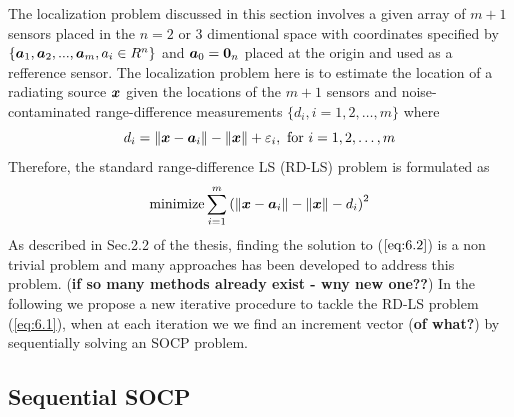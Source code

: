 The localization problem discussed in this section involves a given array of $m+1$ sensors placed in the $n = 2$ or 3 dimentional space with coordinates specified by $\{\mbox{\boldmath$a$}_1, \mbox{\boldmath$a$}_2, . . . , \mbox{\boldmath$a$}_m , a_i \in R^n\}$ and  $\mbox{\boldmath$a$}_0 = \mbox{\boldmath${0}$}_n$ placed at the origin and used as a refference sensor. The localization problem here is to estimate the location of a radiating source $\mbox{\boldmath$x$}$ given the locations of the $m+1$ sensors and noise-contaminated range-difference measurements $\{d_i, i = 1, 2, \ldots, m\}$ where 
\begin{equation} \label{eq:6.1}
d_i = \|\mbox{\boldmath$x$} - \mbox{\boldmath$a$}_i\| - \|\mbox{\boldmath$x$}\| + \varepsilon_i, \mbox{ for } i = 1, 2, \ldots, m
\end{equation}
Therefore, the standard range-difference LS (RD-LS) problem is formulated as
\begin{equation} \label{eq:6.2}
\mathop{\mbox{minimize}} \sum^m_{i=1}\left( \|\mbox{\boldmath$x$} - \mbox{\boldmath$a$}_i\| - \|\mbox{\boldmath$x$}\| - d_i\right)^2
\end{equation}
As described in Sec.2.2 of the thesis, finding the solution to ($\ref{eq:6.2}$) is a non trivial problem and many approaches has been developed to address this problem. (\textbf{if so many methods already exist - wny new one??}) In the following we propose a new iterative procedure to tackle the RD-LS problem (\ref{eq:6.1}), when at each iteration we we find an increment vector (\textbf{of what?}) by sequentially solving an SOCP problem.   

\subsection{Sequential SOCP}

